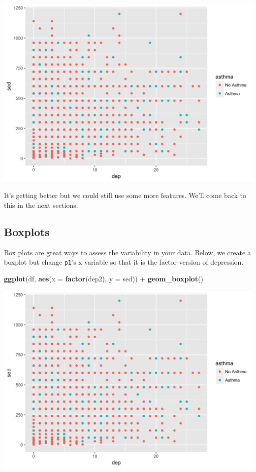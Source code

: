 \documentclass[]{tufte-book}
\newenvironment{Shaded}{}{}
\newcommand{\KeywordTok}[1]{\textcolor[rgb]{0.00,0.44,0.13}{\textbf{#1}}}
\newcommand{\DataTypeTok}[1]{\textcolor[rgb]{0.56,0.13,0.00}{#1}}
\newcommand{\StringTok}[1]{\textcolor[rgb]{0.25,0.44,0.63}{#1}}
\newcommand{\OperatorTok}[1]{\textcolor[rgb]{0.40,0.40,0.40}{#1}}
\newcommand{\NormalTok}[1]{#1}
\theoremstyle{definition}
\theoremstyle{definition}
\theoremstyle{remark}
\begin{document}
\includegraphics{_main_files/figure-latex/unnamed-chunk-135-1}

It's getting better but we could still use some more features. We'll
come back to this in the next sections.

\subsection*{Boxplots}\label{boxplots}

Box plots are great ways to assess the variability in your data. Below,
we create a boxplot but change \texttt{p1}'s x variable so that it is
the factor version of depression.

\begin{Shaded}
\begin{Highlighting}[]
\KeywordTok{ggplot}\NormalTok{(df, }\KeywordTok{aes}\NormalTok{(}\DataTypeTok{x =} \KeywordTok{factor}\NormalTok{(dep2), }\DataTypeTok{y =}\NormalTok{ sed)) }\OperatorTok{+}\StringTok{ }\KeywordTok{geom_boxplot}\NormalTok{()}
\end{Highlighting}
\end{Shaded}

\includegraphics{_main_files/figure-latex/unnamed-chunk-136-1}
\end{document}
